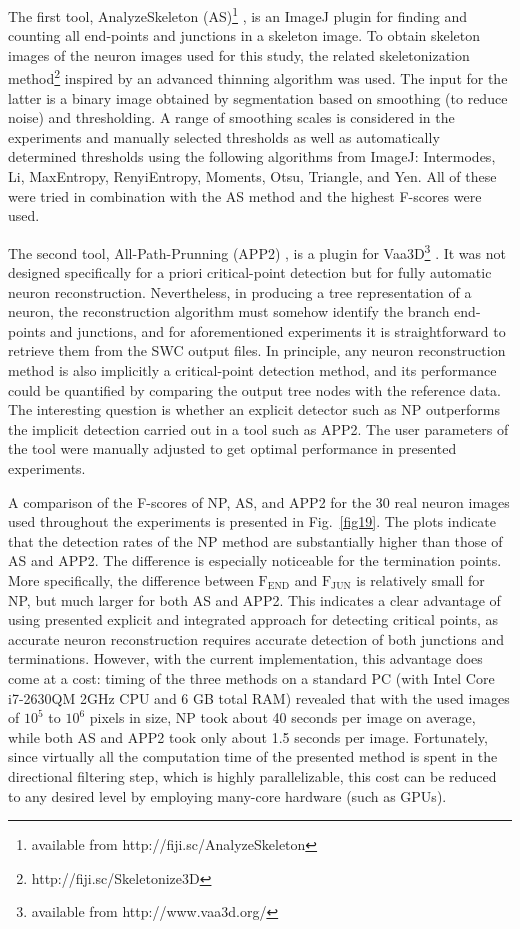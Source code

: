The first tool, AnalyzeSkeleton (AS)\footnote{available from http://fiji.sc/AnalyzeSkeleton} \cite{arganda20103d}, is an ImageJ plugin for finding and counting all end-points and junctions in a skeleton image. To obtain skeleton images of the neuron images used for this study, the related skeletonization method\footnote{http://fiji.sc/Skeletonize3D} inspired by an advanced thinning algorithm \cite{lee1994building} was used. The input for the latter is a binary image obtained by segmentation based on smoothing (to reduce noise) and thresholding. A range of smoothing scales is considered in the experiments and manually selected thresholds as well as automatically determined thresholds using the following algorithms from ImageJ: Intermodes, Li, MaxEntropy, RenyiEntropy, Moments, Otsu, Triangle, and Yen. All of these were tried in combination with the AS method and the highest F-scores were used.

The second tool, All-Path-Prunning (APP2) \cite{xiao2013app2}, is a plugin for Vaa3D\footnote{available from http://www.vaa3d.org/} \cite{peng2010v3d, peng2014extensible}. It was not designed specifically for a priori critical-point detection but for fully automatic neuron reconstruction. Nevertheless, in producing a tree representation of a neuron, the reconstruction algorithm must somehow identify the branch end-points and junctions, and for aforementioned experiments it is straightforward to retrieve them from the SWC output files. In principle, any neuron reconstruction method is also implicitly a critical-point detection method, and its performance could be quantified by comparing the output tree nodes with the reference data. The interesting question is whether an explicit detector such as NP outperforms the implicit detection carried out in a tool such as APP2. The user parameters of the tool were manually adjusted to get optimal performance in presented experiments.

A comparison of the F-scores of NP, AS, and APP2 for the 30 real neuron images used throughout the experiments is presented in Fig.~\ref{fig19}. The plots indicate that the detection rates of the NP method are substantially higher than those of AS and APP2. The difference is especially noticeable for the termination points. More specifically, the difference between $\textrm{F}_{\textrm{END}}$ and $\textrm{F}_{\textrm{JUN}}$ is relatively small for NP, but much larger for both AS and APP2. This indicates a clear advantage of using presented explicit and integrated approach for detecting critical points, as accurate neuron reconstruction requires accurate detection of both junctions and terminations. However, with the current implementation, this advantage does come at a cost: timing of the three methods on a standard PC (with Intel Core i7-2630QM 2GHz CPU and 6 GB total RAM) revealed that with the used images of $10^5$ to $10^6$ pixels in size, NP took about 40 seconds per image on average, while both AS and APP2 took only about 1.5 seconds per image. Fortunately, since virtually all the computation time of the presented method is spent in the directional filtering step, which is highly parallelizable, this cost can be reduced to any desired level by employing many-core hardware (such as GPUs).
